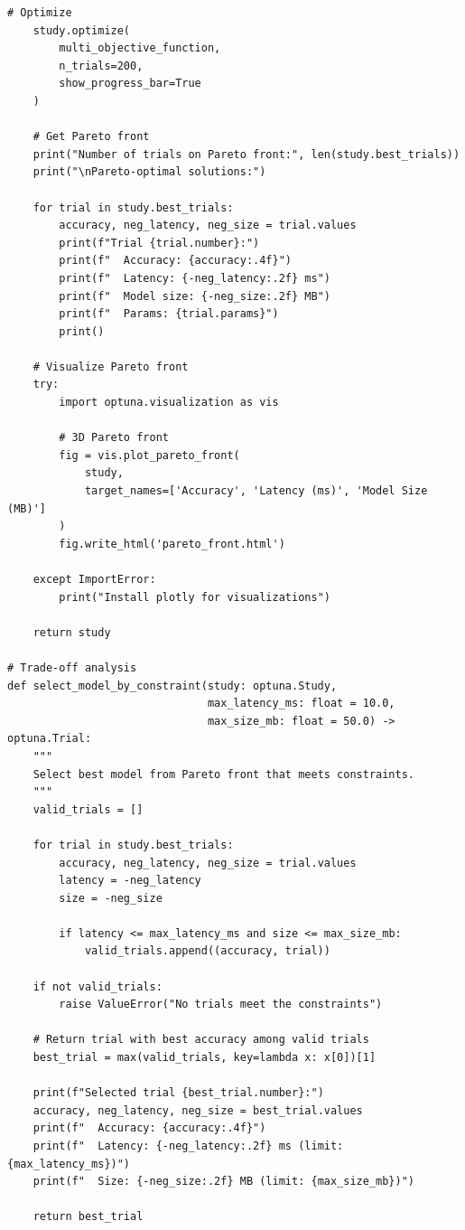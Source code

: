 \begin{lstlisting}[style=python, caption=Multi-objective optimization with Optuna]
    # Optimize
    study.optimize(
        multi_objective_function,
        n_trials=200,
        show_progress_bar=True
    )

    # Get Pareto front
    print("Number of trials on Pareto front:", len(study.best_trials))
    print("\nPareto-optimal solutions:")

    for trial in study.best_trials:
        accuracy, neg_latency, neg_size = trial.values
        print(f"Trial {trial.number}:")
        print(f"  Accuracy: {accuracy:.4f}")
        print(f"  Latency: {-neg_latency:.2f} ms")
        print(f"  Model size: {-neg_size:.2f} MB")
        print(f"  Params: {trial.params}")
        print()

    # Visualize Pareto front
    try:
        import optuna.visualization as vis

        # 3D Pareto front
        fig = vis.plot_pareto_front(
            study,
            target_names=['Accuracy', 'Latency (ms)', 'Model Size (MB)']
        )
        fig.write_html('pareto_front.html')

    except ImportError:
        print("Install plotly for visualizations")

    return study

# Trade-off analysis
def select_model_by_constraint(study: optuna.Study,
                               max_latency_ms: float = 10.0,
                               max_size_mb: float = 50.0) -> optuna.Trial:
    """
    Select best model from Pareto front that meets constraints.
    """
    valid_trials = []

    for trial in study.best_trials:
        accuracy, neg_latency, neg_size = trial.values
        latency = -neg_latency
        size = -neg_size

        if latency <= max_latency_ms and size <= max_size_mb:
            valid_trials.append((accuracy, trial))

    if not valid_trials:
        raise ValueError("No trials meet the constraints")

    # Return trial with best accuracy among valid trials
    best_trial = max(valid_trials, key=lambda x: x[0])[1]

    print(f"Selected trial {best_trial.number}:")
    accuracy, neg_latency, neg_size = best_trial.values
    print(f"  Accuracy: {accuracy:.4f}")
    print(f"  Latency: {-neg_latency:.2f} ms (limit: {max_latency_ms})")
    print(f"  Size: {-neg_size:.2f} MB (limit: {max_size_mb})")

    return best_trial
\end{lstlisting}


